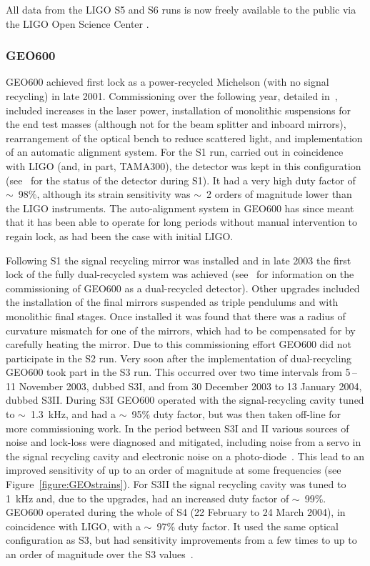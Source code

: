 All data from the LIGO S5 \cite{LOSCS5} and S6 \cite{LOSCS6} runs is now freely available to the public via 
the LIGO Open Science Center \cite{LOSC, 2015JPhCS.610a2021V}.

\subsubsection{GEO600}

GEO600 achieved first lock as a power-recycled Michelson (with no signal recycling) in late 2001. 
Commissioning over the following year, detailed in~\cite{Hewitson:2003}, included increases in the laser
power, installation of monolithic suspensions for the end test masses (although not for the beam splitter and 
inboard mirrors), rearrangement of the optical bench to reduce scattered light, and implementation of an 
automatic alignment system. For the S1 run, carried out in coincidence with LIGO (and, in part, TAMA300), the
detector was kept in this configuration (see~\cite{Abbott:2004a} for the status of the detector during S1). 
It had a very high duty factor of $\sim$~98\%, although its strain sensitivity was $\sim$~2 orders of
magnitude lower than the LIGO instruments. The auto-alignment system in GEO600 has since meant that it has 
been able to operate for long periods without manual intervention to regain lock, as had been the
case with initial LIGO.

Following S1 the signal recycling mirror was installed and in late 2003 the first lock of the fully 
dual-recycled system was achieved (see~\cite{Smith:2004, Willke:2004, Grote:2005} for information on the
commissioning of GEO600 as a dual-recycled detector). Other upgrades included the installation of the final 
mirrors suspended as triple pendulums and with monolithic final stages. Once installed it was found that 
there was a radius of curvature mismatch for one of the mirrors, which had to be compensated for by
carefully heating the mirror. Due to this commissioning effort GEO600 did not participate in the S2 run. Very 
soon after the implementation of dual-recycling GEO600 took part in the S3 run. This occurred over two time 
intervals from 5\,--\,11 November 2003, dubbed S3I, and from 30 December 2003 to 13 January 2004,
dubbed S3II. During S3I GEO600 operated with the signal-recycling cavity tuned to $\sim$~1.3~kHz, and had a 
$\sim$~95\% duty factor, but was then taken off-line for more commissioning work. In the period between S3I 
and II various sources of noise and lock-loss were diagnosed and mitigated, including noise from a servo in 
the signal recycling cavity and electronic noise on a photo-diode~\cite{Smith:2004}. This lead to an improved 
sensitivity of up to an order of magnitude at some frequencies (see Figure~\ref{figure:GEOstrains}). For
S3II the signal recycling cavity was tuned to 1~kHz and, due to the upgrades, had an increased duty factor of 
$\sim$~99\%. GEO600 operated during the whole of S4 (22 February to 24 March 2004), in coincidence with LIGO, 
with a $\sim$~97\% duty factor. It used the same optical configuration as S3, but had sensitivity
improvements from a few times to up to an order of magnitude over the S3 values~\cite{Hild:2006a}.


